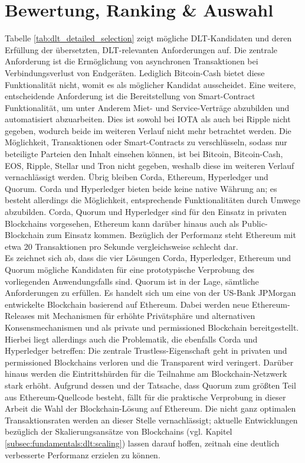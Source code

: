 %
%
\section{Bewertung, Ranking \& Auswahl}
\label{sec:dlt_selection:rating}
Tabelle \ref{tab:dlt_detailed_selection} zeigt mögliche \ac{DLT}-Kandidaten und deren Erfüllung der übersetzten, \ac{DLT}-relevanten Anforderungen auf. Die zentrale Anforderung ist die Ermöglichung von asynchronen Transaktionen bei Verbindungsverlust von Endgeräten. Lediglich Bitcoin-Cash bietet diese Funktionalität nicht, womit es als möglicher Kandidat ausscheidet. Eine weitere, entscheidende Anforderung ist die Bereitstellung von Smart-Contract Funktionalität, um unter Anderem Miet- und Service-Verträge abzubilden und automatisiert abzuarbeiten. Dies ist sowohl bei IOTA als auch bei Ripple nicht gegeben, wodurch beide im weiteren Verlauf nicht mehr betrachtet werden. Die Möglichkeit, Transaktionen oder Smart-Contracts zu verschlüsseln, sodass nur beteiligte Parteien den Inhalt einsehen können, ist bei Bitcoin, Bitcoin-Cash, EOS, Ripple, Stellar und Tron nicht gegeben, weshalb diese im weiteren Verlauf vernachlässigt werden. Übrig bleiben Corda, Ethereum, Hyperledger und Quorum. Corda und Hyperledger bieten beide keine native Währung an; es besteht allerdings die Möglichkeit, entsprechende Funktionalitäten durch Umwege abzubilden. Corda, Quorum und Hyperledger sind für den Einsatz in privaten Blockchains vorgesehen, Ethereum kann darüber hinaus auch als Public-Blockchain zum Einsatz kommen. Bezüglich der Performanz steht Ethereum mit etwa 20 Transaktionen pro Sekunde vergleichsweise schlecht dar.\\
Es zeichnet sich ab, dass die vier Lösungen Corda, Hyperledger, Ethereum und Quorum mögliche Kandidaten für eine prototypische Verprobung des vorliegenden Anwendungsfalls sind. Quorum ist in der Lage, sämtliche Anforderungen zu erfüllen. Es handelt sich um eine von der US-Bank JPMorgan entwickelte Blockchain basierend auf Ethereum. Dabei werden neue Ethereum-Releases mit Mechanismen für erhöhte Privätsphäre und alternativen Konsensmechanismen und als private und permissioned Blockchain bereitgestellt. Hierbei liegt allerdings auch die Problematik, die ebenfalls Corda und Hyperledger betreffen: Die zentrale Trustless-Eigenschaft geht in privaten und permissioned Blockchains verloren und die Transparent wird veringert. Darüber hinaus werden die Eintrittshürden für die Teilnahme am Blockchain-Netzwerk stark erhöht. Aufgrund dessen und der Tatsache, dass Quorum zum größten Teil aus Ethereum-Quellcode besteht, fällt für die praktische Verprobung in dieser Arbeit die Wahl der Blockchain-Lösung auf Ethereum. Die nicht ganz optimalen Transaktionsraten werden an dieser Stelle vernachlässigt; aktuelle Entwicklungen bezüglich der Skalierungsansätze von Blockchains (vgl. Kapitel \ref{subsec:fundamentals:dlt:scaling}) lassen darauf hoffen, zeitnah eine deutlich verbesserte Performanz erzielen zu können.
